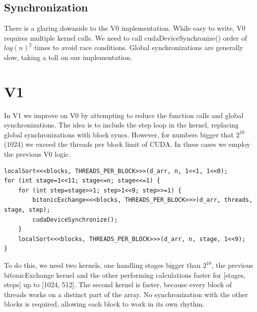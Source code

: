 \documentclass[12pt]{report}
\begin{document}
\subsection{Synchronization}

There is a glaring downside to the V0 implementation. While easy to write, V0 requires multiple kernel calls. We need to call cudaDeviceSynchronize() order of $log(n)^2$ times to avoid race conditions. Global synchronizations are generally slow, taking a toll on our implementation. \newpage

\section{V1}

In V1 we improve on V0 by attempting to reduce the function calls and global synchronizations. The idea is to include the step loop in the kernel, replacing global synchronizations with block syncs. However, for numbers bigger that $2^{10}$ (1024) we exceed the threads per block limit of CUDA. In these cases we employ the previous V0 logic.

\begin{lstlisting}[style=cstyle]
localSort<<<blocks, THREADS_PER_BLOCK>>>(d_arr, n, 1<<1, 1<<0);
for (int stage=1<<11; stage<=n; stage<<=1) {
    for (int step=stage>>1; step>1<<9; step>>=1) {
        bitonicExchange<<<blocks, THREADS_PER_BLOCK>>>(d_arr, threads, stage, step);
        cudaDeviceSynchronize();
    }
    localSort<<<blocks, THREADS_PER_BLOCK>>>(d_arr, n, stage, 1<<9);
}
\end{lstlisting}

To do this, we need two kernels, one handling stages bigger than $2^{10}$, the previous bitonicExchange kernel and the other performing calculations faster for [stages, steps] up to [1024, 512]. The second kernel is faster, because every block of threads works on a distinct part of the array. No synchronization with the other blocks is required, allowing each block to work in its own rhythm.
\end{document}
